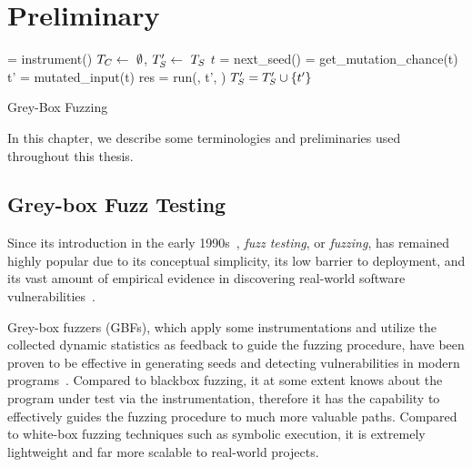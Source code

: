 \chapter{Preliminary} \label{ch:preliminary}

\begin{algorithm}[t]
 \small
{}
	\Prog = instrument(\ProgO) 
	$T_{C} \leftarrow~\emptyset$, $T^{\prime}_{S} \leftarrow~T_{S}$\; 
	 {
		$t$ = next\_seed(\FinalSeeds) 
		\mutChance = get\_mutation\_chance(t)  \label{line:algo:energy}
		 {
			t' = mutated\_input(t)  
			res = run(\Prog, t', \Ncal)
			 {\label{line:algo:new_cov}
				$T^{\prime}_{S} = T^{\prime}_{S}\cup\{t'\}$  \label{line:algo:triage_end}
			}
		}
	}
	\caption{Grey-Box Fuzzing}\label{algo:gbf}
\end{algorithm}

In this chapter, we describe some terminologies and preliminaries used throughout this thesis.

\section{Grey-box Fuzz Testing}
Since its introduction in the early 1990s~\cite{fuzzing1990}, \emph{fuzz testing}, or \emph{fuzzing}, has remained highly popular due to its conceptual simplicity, its low barrier to deployment, and its vast amount of empirical evidence in discovering real-world software vulnerabilities~\cite{fuzz_survey}.

Grey-box fuzzers (GBFs), which apply some instrumentations and utilize the collected dynamic statistics as feedback to guide the fuzzing procedure, have been proven to be effective in generating seeds and detecting vulnerabilities in modern programs~\cite{fuzz_survey,afl,libfuzzer,Angora}. Compared to blackbox fuzzing, it at some extent knows about the program under test via the instrumentation, therefore it has the capability to effectively guides the fuzzing procedure to much more valuable paths. Compared to white-box fuzzing techniques such as symbolic execution, it is extremely lightweight and far more scalable to real-world projects.


